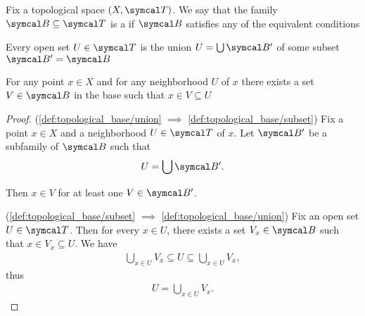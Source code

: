 \begin{definition}\label{def:topological_base}\cite[12]{Engelking1989}
  Fix a topological space \( (X, \Cal{T}) \). We say that the family \( \Cal{B} \subseteq \Cal{T} \) is a  if \( \Cal{B} \) satisfies any of the equivalent conditions
  \begin{defenum}
    \item\label{def:topological_base/union} Every open set \( U \in \Cal{T} \) is the union \( U = \bigcup \Cal{B}' \) of some subset \( \Cal{B}' = \Cal{B} \)
    \item\label{def:topological_base/subset} For any point \( x \in X \) and for any neighborhood \( U \) of \( x \) there exists a set \( V \in \Cal{B} \) in the base such that \( x \in V \subseteq U \)
  \end{defenum}
\end{definition}
\begin{proof}
  (\ref{def:topological_base/union} \( \implies \) \ref{def:topological_base/subset}) Fix a point \( x \in X \) and a neighborhood \( U \in \Cal{T} \) of \( x \). Let \( \Cal{B}' \) be a subfamily of \( \Cal{B} \) such that
  \begin{align*}
    U = \bigcup \Cal{B}'.
  \end{align*}

  Then \( x \in V \) for at least one \( V \in \Cal{B}' \).

  (\ref{def:topological_base/subset} \( \implies \) \ref{def:topological_base/union}) Fix an open set \( U \in \Cal{T} \). Then for every \( x \in U \), there exists a set \( V_x \in \Cal{B} \) such that \( x \in V_x \subseteq U \). We have
  \begin{align*}
    \bigcup_{x \in U} V_x \subseteq U \subseteq \bigcup_{x \in U} V_x,
  \end{align*}
  thus
  \begin{align*}
    U = \bigcup_{x \in U} V_x.
  \end{align*}
\end{proof}

